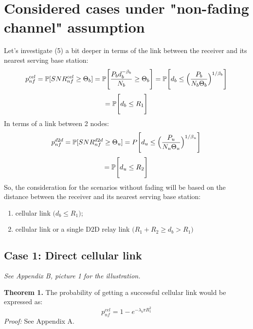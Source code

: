 \section {Considered cases under "non-fading channel" assumption}
Let's investigate (5) a bit deeper in terms of the link between the receiver and its nearest serving base station:
\[p_{nf}^{cel}=\P[SNR_{nf}^{cel}\ge\Theta_b]=\P\Bigg[\frac {P_b d_b^{-\beta_b}}{N_b}\ge\Theta_b\Bigg]=\P\Bigg[d_b\le\Big(\frac {P_b}{N_b \Theta_b}\Big)^{1/\beta_b}\Bigg]\]
\begin{equation}
=\P\Bigg[d_b\le R_1\Bigg]
\end{equation}
In terms of a link between 2 nodes:
\[p_{nf}^{d2d}=\P[SNR_{nf}^{d2d}\ge\Theta_u]=P\Bigg[d_u\le\Big(\frac {P_u}{N_u \Theta_u}\Big)^{1/\beta_u}\Bigg]\]
\begin{equation}
=\P\Bigg[d_u\le R_2\Bigg]
\end{equation}
So, the consideration for the scenarios without fading will be based on the distance between the receiver and its nearest serving base station:
\begin {enumerate}
  \item cellular link \(\Big(d_b\le R_1\Big)\);
  \item cellular link or a single D2D relay link \(\Big(R_1+R_2\ge d_b>R_1\Big)\)
\end {enumerate}

\subsection{Case 1: Direct cellular link}
{\it See Appendix B, picture 1 for the illustration.}        
\begin {framed}
{\bf Theorem 1.}	
The probability of getting a successful cellular link would be expressed as:
	\[p_{nf}^{cel}=1-e^{-\lambda_b\pi R_1^2}\]
{\it Proof:}  See Appendix A.
\end {framed}
